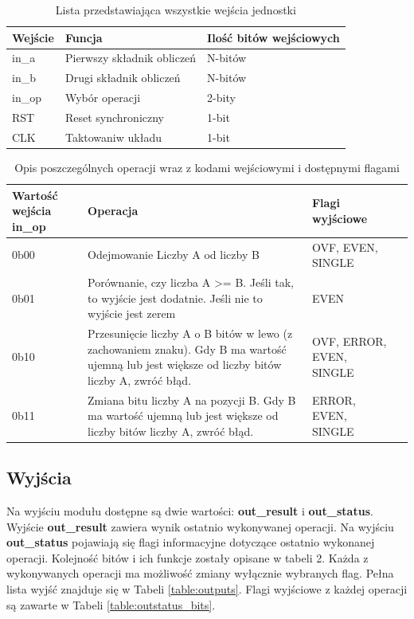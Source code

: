 \documentclass[12pt]{article}
\begin{document}
		\begin{table}[!ht]
		\centering
		\begin{tabular}{|l|l|l|}
			\hline
			\textbf{Wejście} & \textbf{Funcja} & \textbf{Ilość bitów wejściowych} \\ \hline
			in\_a & Pierwszy składnik obliczeń & N-bitów \\ \hline
			in\_b & Drugi składnik obliczeń & N-bitów \\ \hline
			in\_op & Wybór operacji & 2-bity \\ \hline
			RST & Reset synchroniczny & 1-bit \\ \hline
			CLK & Taktowaniw układu & 1-bit \\ \hline
		\end{tabular}
		\caption{Lista przedstawiająca wszystkie wejścia jednostki}
		\label{table:inputs}
	\end{table}
	
	\begin{table}[!ht]
		\centering
		\begin{tabularx}{\linewidth}{|X|X|X|X|}
			\hline
			\textbf{Wartość wejścia in\_op} & \textbf{Operacja} & \textbf{Flagi wyjściowe} \\ \hline
			0b00 & Odejmowanie Liczby A od liczby B & OVF, EVEN, SINGLE \\ \hline
			0b01 & Porównanie, czy liczba \newline A >= B. Jeśli tak, to wyjście jest dodatnie. Jeśli nie to wyjście jest zerem & EVEN \\ \hline
			0b10 & Przesunięcie liczby A o B bitów w lewo (z zachowaniem znaku). Gdy B ma wartość ujemną lub jest większe od liczby bitów liczby A, zwróć błąd. & OVF, ERROR, EVEN, SINGLE \\ \hline
			0b11 & Zmiana bitu liczby A na pozycji B. Gdy B ma wartość ujemną lub jest większe od liczby bitów liczby A, zwróć błąd. & ERROR, EVEN, SINGLE \\ \hline
		\end{tabularx}
		\caption{Opis poszczególnych operacji wraz z kodami wejściowymi i dostępnymi flagami}
		\label{table:inop_values}
	\end{table}

	
	\subsection*{Wyjścia}
	Na wyjściu modułu dostępne są dwie wartości: \textbf{out\_result} i \textbf{out\_status}. Wyjście \textbf{out\_result} zawiera wynik ostatnio wykonywanej operacji. Na wyjściu \textbf{out\_status} pojawiają się flagi informacyjne dotyczące ostatnio wykonanej operacji. Kolejność bitów i ich funkcje zostały opisane w tabeli 2. Każda z wykonywanych operacji ma możliwość zmiany wyłącznie wybranych flag. Pełna lista wyjść znajduje się w Tabeli \ref{table:outputs}. Flagi wyjściowe z każdej operacji są zawarte w Tabeli \ref{table:outstatus_bits}. 
	
\end{document}

